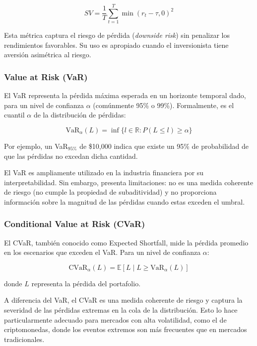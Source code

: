 \begin{equation}
  SV = \frac{1}{T} \sum_{t=1}^{T} \min(r_t - \tau, 0)^2
\end{equation}

Esta métrica captura el riesgo de pérdida (\textit{downside risk})
sin penalizar los rendimientos favorables. Su uso es apropiado cuando
el inversionista tiene aversión asimétrica al riesgo.

\subsubsection{Value at Risk (VaR)}

El VaR representa la pérdida máxima esperada en un horizonte temporal
dado, para un nivel de confianza $\alpha$ (comúnmente 95\% o 99\%).
Formalmente, es el cuantil $\alpha$ de la distribución de pérdidas:

\begin{equation}
  \mathrm{VaR}_{\alpha}(L) = \inf \{ l \in \mathbb{R} : P(L \leq l)
  \geq \alpha \}
\end{equation}

Por ejemplo, un VaR$_{95\%}$ de \$10,000 indica que existe un 95\% de
probabilidad de que las pérdidas no excedan dicha cantidad.

El VaR es ampliamente utilizado en la industria financiera por su
interpretabilidad. Sin embargo, presenta limitaciones: no es una
medida coherente de riesgo (no cumple la propiedad de subaditividad)
y no proporciona información sobre la magnitud de las pérdidas cuando
estas exceden el umbral.

\subsubsection{Conditional Value at Risk (CVaR)}

El CVaR, también conocido como Expected Shortfall, mide la pérdida
promedio en los escenarios que exceden el VaR. Para un nivel de
confianza $\alpha$:

\begin{equation}
  \mathrm{CVaR}_{\alpha}(L) = \mathbb{E}\left[L \mid L
  \ge \mathrm{VaR}_{\alpha}(L)\right]
\end{equation}

donde $L$ representa la pérdida del portafolio.

A diferencia del VaR, el CVaR es una medida coherente de riesgo y
captura la severidad de las pérdidas extremas en la cola de la
distribución. Esto lo hace particularmente adecuado para mercados con
alta volatilidad, como el de criptomonedas, donde los eventos
extremos son más frecuentes que en mercados tradicionales.

